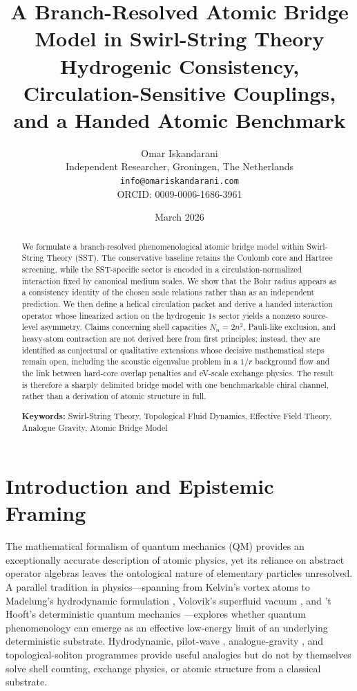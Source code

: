 \documentclass[11pt,a4paper]{article}
\title{A Branch-Resolved Atomic Bridge Model in Swirl-String Theory\\
\large Hydrogenic Consistency, Circulation-Sensitive Couplings, and a Handed Atomic Benchmark}
\author{Omar Iskandarani \\
Independent Researcher, Groningen, The Netherlands \\
\texttt{info@omariskandarani.com} \\
ORCID: 0009-0006-1686-3961}
\date{March 2026}
\begin{document}
    \maketitle
    
    \begin{abstract}
        We formulate a branch-resolved phenomenological atomic bridge model within Swirl-String Theory (SST). The conservative baseline retains the Coulomb core and Hartree screening, while the SST-specific sector is encoded in a circulation-normalized interaction fixed by canonical medium scales. We show that the Bohr radius appears as a consistency identity of the chosen scale relations rather than as an independent prediction. We then define a helical circulation packet and derive a handed interaction operator whose linearized action on the hydrogenic $1s$ sector yields a nonzero source-level asymmetry. Claims concerning shell capacities $N_n=2n^2$, Pauli-like exclusion, and heavy-atom contraction are not derived here from first principles; instead, they are identified as conjectural or qualitative extensions whose decisive mathematical steps remain open, including the acoustic eigenvalue problem in a $1/r$ background flow and the link between hard-core overlap penalties and eV-scale exchange physics. The result is therefore a sharply delimited bridge model with one benchmarkable chiral channel, rather than a derivation of atomic structure in full.
        
        \vspace{0.5cm}
        \noindent \textbf{Keywords:} Swirl-String Theory, Topological Fluid Dynamics, Effective Field Theory, Analogue Gravity, Atomic Bridge Model
    \end{abstract}
    
    \section{Introduction and Epistemic Framing}
    \label{sec:intro}
        The mathematical formalism of quantum mechanics (QM) provides an exceptionally accurate description of atomic physics, yet its reliance on abstract operator algebras leaves the ontological nature of elementary particles unresolved. A parallel tradition in physics---spanning from Kelvin's vortex atoms \cite{Kelvin1869} to Madelung's hydrodynamic formulation \cite{Madelung1927}, Volovik's superfluid vacuum \cite{Volovik2003}, and 't Hooft's deterministic quantum mechanics \cite{tHooft2016}---explores whether quantum phenomenology can emerge as an effective low-energy limit of an underlying deterministic substrate. Hydrodynamic, pilot-wave \cite{Bohm1952,CouderFort2006,Bush2015}, analogue-gravity \cite{BarceloLiberatiVisser2011}, and topological-soliton \cite{Skyrme1962,FaddeevNiemi1997} programmes provide useful analogies but do not by themselves solve shell counting, exchange physics, or atomic structure from a classical substrate.
        
\end{document}
